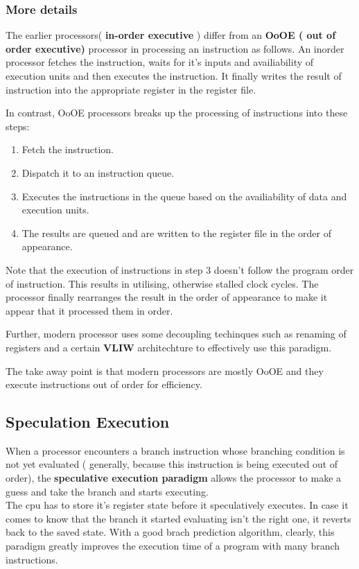 \documentclass[12pt]{article}
\begin{document}
\subsubsection{More details}
The earlier processors( \textbf{in-order executive} ) differ from an \textbf{OoOE ( out of order executive)} processor in processing an instruction as follows. An inorder processor fetches the instruction, waits for it's inputs and availiability of execution units and then executes the instruction. It finally writes the result of instruction into the appropriate register in the register file. 

In contrast, OoOE processors breaks up the processing of instructions into these steps:
\begin{enumerate}
	\item Fetch the instruction.
	\item Dispatch it to an instruction queue.
	\item Executes the instructions in the queue based on the availiability of data and execution units.
	\item The results are queued and are written to the register file in the order of appearance.
\end{enumerate}

Note that the execution of instructions in step 3 doesn't follow the program order of instruction. 
This results in utilising, otherwise stalled clock cycles. The processor finally rearranges the result in the order of appearance to make it appear that it processed them in order. 

Further, modern processor uses some decoupling techinques such as renaming of registers and a certain \textbf{VLIW} architechture to effectively use this paradigm.

   The take away point is that modern processors are mostly OoOE and they execute instructions out of order for efficiency. 
  
\subsection{Speculation Execution}

When a processor encounters a branch instruction whose branching condition is not yet evaluated ( generally, because this instruction is being executed out of order), the \textbf{speculative execution paradigm} allows the processor to make a guess and take the branch and starts executing. \\
The cpu has to store it's register state before it speculatively executes. In case it comes to know that the branch it started evaluating isn't the right one, it reverts back to the saved state. With a good brach prediction algorithm, clearly, this paradigm greatly improves the execution time of a program with many branch instructions. 
\end{document}
